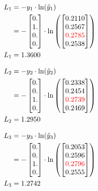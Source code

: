 \documentclass{article}
\begin{document}
\begin{align*}
    L_1 &= -y_1 \cdot \ln(\hat{y}_1) \\
    &= -\begin{bmatrix} 0. \\ 1. \\ 0. \\ 0. \end{bmatrix} \cdot \ln\left(\begin{bmatrix} 
0.2110\\
0.2567\\
\textcolor{red}{0.2785}\\
0.2538\\
\end{bmatrix}\right) \\
    L_1 &=  1.3600
\end{align*}

\begin{align*}
    L_2 &= -y_2 \cdot \ln(\hat{y}_2) \\
    &= -\begin{bmatrix} 0. \\ 0. \\ 1. \\ 0. \end{bmatrix} \cdot \ln\left(\begin{bmatrix} 
0.2338\\
0.2454\\
\textcolor{red}{0.2739}\\
0.2469\\
\end{bmatrix}\right) \\
    L_2 &=  1.2950
\end{align*}

\begin{align*}
    L_3 &= -y_3 \cdot \ln(\hat{y}_3) \\
    &= -\begin{bmatrix} 0. \\ 0. \\ 1. \\ 0. \end{bmatrix} \cdot \ln\left(\begin{bmatrix} 
0.2053\\
0.2596\\
\textcolor{red}{0.2796}\\
0.2555\\
\end{bmatrix}\right) \\
    L_3 &=  1.2742
\end{align*}
\end{document}
